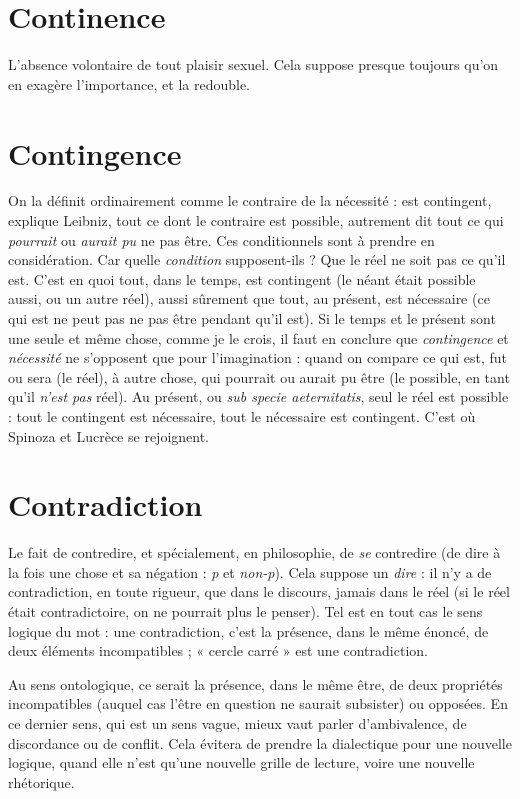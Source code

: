 \section{Continence}
L'absence volontaire de tout plaisir sexuel. Cela suppose
presque toujours qu'on en exagère l'importance, et la
redouble.

\section{Contingence}
On la définit ordinairement comme le contraire de la nécessité :
est contingent, explique Leibniz, tout ce dont le
contraire est possible, autrement dit tout ce qui {\it pourrait} ou {\it aurait pu} ne pas
être. Ces conditionnels sont à prendre en considération. Car quelle {\it condition} supposent-ils ?
Que le réel ne soit pas ce qu’il est. C’est en quoi tout, dans le temps,
est contingent (le néant était possible aussi, ou un autre réel), aussi sûrement que
tout, au présent, est nécessaire (ce qui est ne peut pas ne pas être pendant qu’il
est). Si le temps et le présent sont une seule et même chose, comme je le crois, il
faut en conclure que {\it contingence} et {\it nécessité} ne s'opposent que pour l’imagination :
quand on compare ce qui est, fut ou sera (le réel), à autre chose, qui
pourrait ou aurait pu être (le possible, en tant qu’il {\it n'est pas} réel). Au présent, ou
{\it sub specie aeternitatis}, seul le réel est possible : tout le contingent est nécessaire,
tout le nécessaire est contingent. C’est où Spinoza et Lucrèce se rejoignent.

\section{Contradiction}
Le fait de contredire, et spécialement, en philosophie,
de {\it se} contredire (de dire à la fois une chose et sa
négation : {\it p} et {\it non-p}). Cela suppose un {\it dire} : il n’y a de contradiction, en toute
rigueur, que dans le discours, jamais dans le réel (si le réel était contradictoire,
on ne pourrait plus le penser). Tel est en tout cas le sens logique du mot : une
contradiction, c’est la présence, dans le même énoncé, de deux éléments
incompatibles ; « cercle carré » est une contradiction.

Au sens ontologique, ce serait la présence, dans le même être, de deux propriétés
incompatibles (auquel cas l'être en question ne saurait subsister) ou
opposées. En ce dernier sens, qui est un sens vague, mieux vaut parler d’ambivalence,
de discordance ou de conflit. Cela évitera de prendre la dialectique
pour une nouvelle logique, quand elle n’est qu’une nouvelle grille de lecture,
voire une nouvelle rhétorique.

